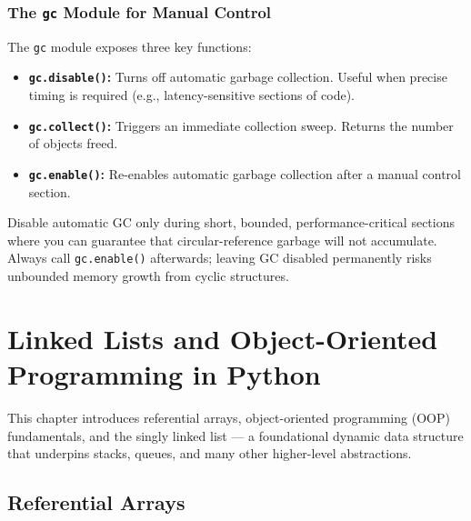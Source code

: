 \documentclass[11pt, a4paper, notitlepage]{report}
\theoremstyle{definition}
\theoremstyle{remark}
\theoremstyle{definition}
\begin{document}
\subsection{The \texttt{gc} Module for Manual Control}
\label{subsec:gc-module}

The \texttt{gc} module exposes three key functions:

\begin{itemize}
  \item \textbf{\texttt{gc.disable()}:} Turns off automatic garbage collection. Useful when
        precise timing is required (e.g., latency-sensitive sections of code).
  \item \textbf{\texttt{gc.collect()}:} Triggers an immediate collection sweep. Returns the
        number of objects freed.
  \item \textbf{\texttt{gc.enable()}:} Re-enables automatic garbage collection after a manual
        control section.
\end{itemize}

\begin{examtip}[title={Exam Tip: When to Use Manual GC Control}]
Disable automatic GC only during short, bounded, performance-critical sections where you can
guarantee that circular-reference garbage will not accumulate. Always call \texttt{gc.enable()}
afterwards; leaving GC disabled permanently risks unbounded memory growth from cyclic
structures.
\end{examtip}



\chapter{Linked Lists and Object-Oriented Programming in Python}
\label{ch:linked-lists-oop}

This chapter introduces referential arrays, object-oriented programming (OOP)
fundamentals, and the singly linked list --- a foundational dynamic data structure
that underpins stacks, queues, and many other higher-level abstractions.

\section{Referential Arrays}
\label{sec:referential-arrays}
\end{document}
